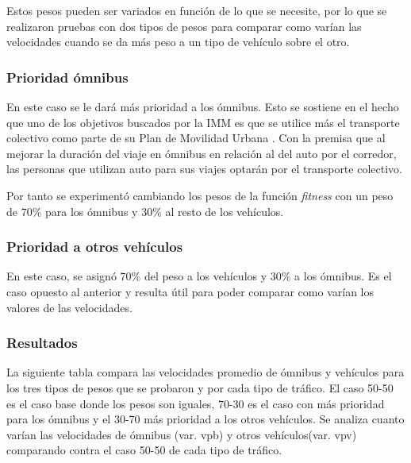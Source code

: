 Estos pesos pueden ser variados en función de lo que se necesite, por lo que se realizaron pruebas con dos tipos de pesos para comparar como varían las velocidades cuando se da más peso a un tipo de vehículo sobre el otro.


\subsubsection{Prioridad ómnibus}
En este caso se le dará más prioridad a los ómnibus. Esto se sostiene en el hecho que uno de los objetivos buscados por la IMM  es que se utilice más el transporte colectivo como parte de su Plan de Movilidad Urbana \citep{PlanMovilidad}. Con la premisa que al mejorar la duración del viaje en ómnibus en relación al del auto por el corredor, las personas que utilizan auto para sus viajes optarán por el transporte colectivo.

Por tanto se experimentó cambiando los pesos de la función \emph{fitness} con un peso de 70\% para los ómnibus y 30\% al resto de los vehículos.


\subsubsection{Prioridad a otros vehículos}

En este caso, se asignó 70\% del peso a los vehículos y 30\% a los ómnibus. Es el caso opuesto al anterior y resulta útil para poder comparar como varían los valores de las velocidades.

\subsubsection{Resultados}

La siguiente tabla compara las velocidades promedio de ómnibus y vehículos para los tres tipos de pesos que se probaron y por cada tipo de tráfico.  El caso 50-50 es el caso base donde los pesos son iguales, 70-30 es el caso con más prioridad para los ómnibus y el 30-70 más prioridad a los otros vehículos. Se analiza cuanto varían las velocidades de ómnibus (var. vpb) y otros vehículos(var. vpv) comparando contra el caso 50-50 de cada tipo de tráfico.


